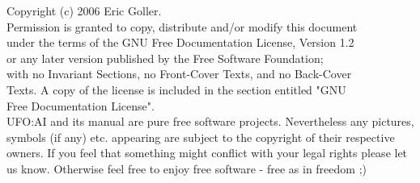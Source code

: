 
%
%





Copyright (c)  2006 Eric Goller.\\
Permission is granted to copy, distribute and/or modify this document\\
under the terms of the GNU Free Documentation License, Version 1.2\\
or any later version published by the Free Software Foundation;\\
with no Invariant Sections, no Front-Cover Texts, and no Back-Cover\\
Texts.  A copy of the license is included in the section entitled "GNU\\
Free Documentation License".\\

UFO:AI and its manual are pure free software projects. Nevertheless any pictures, symbols (if any) etc. appearing are subject to the copyright of their respective owners. If you feel that something might conflict with your legal rights please let us know. Otherwise feel free to enjoy free software - free as in freedom ;) 

\maketitle
\newpage
%
\tableofcontents



\appendix





